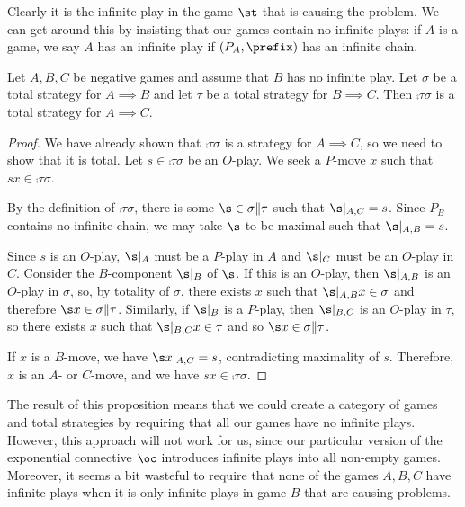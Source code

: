 \documentclass[11pt]{article} %
\begin{document}
Clearly it is the infinite play in the game $\st$ that is causing the problem.  We can get around this by insisting that our games contain no infinite plays: if $A$ is a game, we say $A$ has an infinite play if $(P_A,\prefix)$ has an infinite chain.

\begin{proposition}
  \label{BoundedTotalComposition}
  Let $A,B,C$ be negative games and assume that $B$ has no infinite play.  Let $\sigma$ be a total strategy for $A\implies B$ and let $\tau$ be a total strategy for $B\implies C$.  Then $\comp\tau\sigma$ is a total strategy for $A\implies C$.
  \begin{proof}
    We have already shown that $\comp\tau\sigma$ is a strategy for $A\implies C$, so we need to show that it is total.  Let $s\in\comp\tau\sigma$ be an $O$-play.  We seek a $P$-move $x$ such that $sx\in\comp\tau\sigma$.  

    By the definition of $\comp\tau\sigma$, there is some $\s\in\sigma\|\tau$ such that $\s\vert_{A,C}=s$.  Since $P_B$ contains no infinite chain, we may take $\s$ to be maximal such that $\s\vert_{A,B}=s$.  
    
    Since $s$ is an $O$-play, $\s\vert_A$ must be a $P$-play in $A$ and $\s\vert_C$ must be an $O$-play in $C$.  Consider the $B$-component $\s\vert_B$ of $\s$.  If this is an $O$-play, then $\s\vert_{A,B}$ is an $O$-play in $\sigma$, so, by totality of $\sigma$, there exists $x$ such that $\s\vert_{A,B}x\in\sigma$ and therefore $\s x\in\sigma\|\tau$.  Similarly, if $\s\vert_B$ is a $P$-play, then $\s\vert_{B,C}$ is an $O$-play in $\tau$, so there exists $x$ such that $\s\vert_{B,C}x\in\tau$ and so $\s x\in\sigma\|\tau$.  

    If $x$ is a $B$-move, we have $\s x\vert_{A,C}=s$, contradicting maximality of $s$.  Therefore, $x$ is an $A$- or $C$-move, and we have $sx\in\comp\tau\sigma$.
  \end{proof}
\end{proposition}

The result of this proposition means that we could create a category of games and total strategies by requiring that all our games have no infinite plays.  However, this approach will not work for us, since our particular version of the exponential connective $\oc$ introduces infinite plays into all non-empty games.  Moreover, it seems a bit wasteful to require that none of the games $A,B,C$ have infinite plays when it is only infinite plays in game $B$ that are causing problems.  
\end{document}
